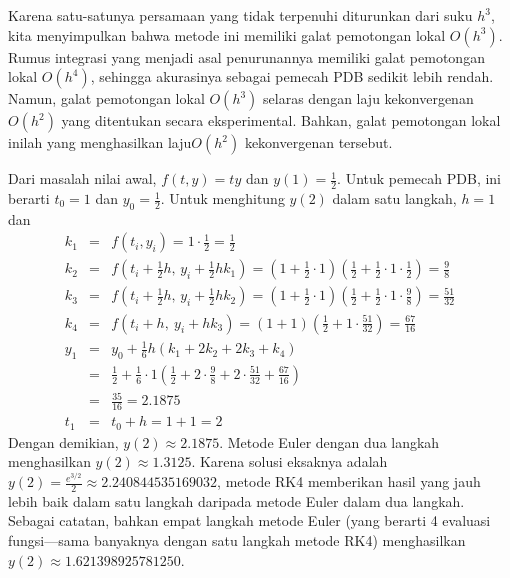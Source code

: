 \begin{description}
Karena satu-satunya persamaan yang tidak terpenuhi diturunkan dari
suku $h^{3}$, kita menyimpulkan bahwa metode ini memiliki galat pemotongan
lokal $O(h^{3})$. Rumus integrasi yang menjadi asal penurunannya
memiliki galat pemotongan lokal $O(h^{4})$, sehingga akurasinya sebagai
pemecah PDB sedikit lebih rendah. Namun, galat pemotongan lokal $O(h^{3})$
selaras dengan laju kekonvergenan $O(h^{2})$ yang ditentukan secara
eksperimental. Bahkan, galat pemotongan lokal inilah yang menghasilkan
laju$O(h^{2})$ kekonvergenan tersebut.
\item [{\ref{exc:ode-errorAnalysis-1}:}] Dari masalah nilai awal, $f(t,y)=ty$
dan $y(1)=\frac{1}{2}$. Untuk pemecah PDB, ini berarti $t_{0}=1$
dan $y_{0}=\frac{1}{2}$. Untuk menghitung $y(2)$ dalam satu langkah,
$h=1$ dan 
\begin{eqnarray*}
k_{1} & = & f(t_{i},y_{i})=1\cdot\frac{1}{2}=\frac{1}{2}\\
k_{2} & = & f(t_{i}+\frac{1}{2}h,\,y_{i}+\frac{1}{2}hk_{1})=\left(1+\frac{1}{2}\cdot1\right)\left(\frac{1}{2}+\frac{1}{2}\cdot1\cdot\frac{1}{2}\right)=\frac{9}{8}\\
k_{3} & = & f(t_{i}+\frac{1}{2}h,\,y_{i}+\frac{1}{2}hk_{2})=\left(1+\frac{1}{2}\cdot1\right)\left(\frac{1}{2}+\frac{1}{2}\cdot1\cdot\frac{9}{8}\right)=\frac{51}{32}\\
k_{4} & = & f(t_{i}+h,\ y_{i}+hk_{3})=(1+1)\left(\frac{1}{2}+1\cdot\frac{51}{32}\right)=\frac{67}{16}\\
y_{1} & = & y_{0}+\frac{1}{6}h(k_{1}+2k_{2}+2k_{3}+k_{4})\\
 & = & \frac{1}{2}+\frac{1}{6}\cdot1\left(\frac{1}{2}+2\cdot\frac{9}{8}+2\cdot\frac{51}{32}+\frac{67}{16}\right)\\
 & = & \frac{35}{16}=2.1875\\
t_{1} & = & t_{0}+h=1+1=2
\end{eqnarray*}
Dengan demikian, $y(2)\approx2.1875$. Metode Euler dengan dua langkah
menghasilkan $y(2)\approx1.3125$. Karena solusi eksaknya adalah $y(2)=\frac{e^{3/2}}{2}\approx2.240844535169032$,
metode RK4 memberikan hasil yang jauh lebih baik dalam satu langkah
daripada metode Euler dalam dua langkah. Sebagai catatan, bahkan empat
langkah metode Euler (yang berarti 4 evaluasi fungsi---sama banyaknya
dengan satu langkah metode RK4) menghasilkan $y(2)\approx1.621398925781250$.
\end{description}

